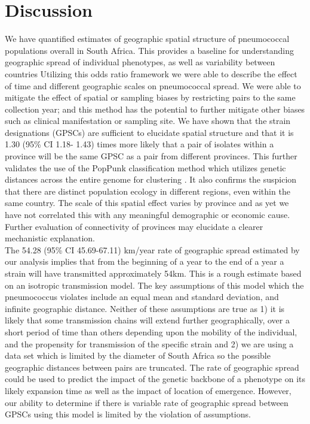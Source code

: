 \documentclass{article}
\begin{document}
\section{Discussion}
We have quantified estimates of geographic spatial structure of pneumococcal populations overall in South Africa. This provides a baseline for understanding geographic spread of individual phenotypes, as well as variability between countries Utilizing this odds ratio framework we were able to describe the effect of time and different geographic scales on pneumococcal spread.  We were able to mitigate the effect of spatial or sampling biases by restricting pairs to the same collection year; and this method has the potential to further mitigate other biases such as clinical manifestation or sampling site. We have shown that the strain designations (GPSCs) are sufficient to elucidate spatial structure and that it is 1.30 (95\% CI 1.18- 1.43) times more likely that a pair of isolates within a province will be the same GPSC as a pair from different provinces. This further validates the use of the PopPunk classification method which utilizes genetic distances across the entire genome for clustering \cite{leesFastFlexibleBacterial2019}. It also confirms the suspicion that there are distinct population ecology in different regions, even within the same country. The scale of this spatial effect varies by province and as yet we have not correlated this with any meaningful demographic or economic cause. Further evaluation of connectivity of provinces may elucidate a clearer mechanistic explanation. 
 \\The 54.28 (95\% CI 45.69-67.11) km/year rate of geographic spread estimated by our analysis implies that from the beginning of a year to the end of a year a strain will have transmitted approximately 54km. This is a rough estimate based on an isotropic transmission model. The key assumptions of this model which the pneumococcus violates include an equal mean and standard deviation, and infinite geographic distance. Neither of these assumptions are true as 1) it is likely that some transmission chains will extend further geographically, over a short period of time than others depending upon the mobility of the individual, and the propensity for transmission of the specific strain and 2) we are using a data set which is limited by the diameter of South Africa so the possible geographic distances between pairs are truncated. The rate of geographic spread could be used to predict the impact of the genetic backbone of a phenotype on its likely expansion time as well as the impact of location of emergence. However, our ability to determine if there is variable rate of geographic spread between GPSCs using this model is limited by the violation of assumptions. 
\end{document}

